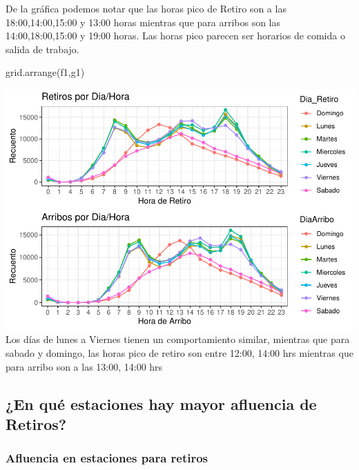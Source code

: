 \documentclass[
]{article}
\newenvironment{Shaded}{\begin{snugshade}}{\end{snugshade}}
\newcommand{\FunctionTok}[1]{\textcolor[rgb]{0.00,0.00,0.00}{#1}}
\newcommand{\NormalTok}[1]{#1}
\begin{document}
De la gráfica podemos notar que las horas pico de Retiro son a las
18:00,14:00,15:00 y 13:00 horas mientras que para arribos son las
14:00,18:00,15:00 y 19:00 horas. Las horas pico parecen ser horarios de
comida o salida de trabajo.

\begin{Shaded}
\begin{Highlighting}[]
\FunctionTok{grid.arrange}\NormalTok{(f1,g1)}
\end{Highlighting}
\end{Shaded}

\includegraphics{Ecobici_files/figure-latex/unnamed-chunk-3-1.pdf} Los
días de lunes a Viernes tienen un comportamiento similar, mientras que
para sabado y domingo, las horas pico de retiro son entre 12:00, 14:00
hrs mientras que para arribo son a las 13:00, 14:00 hrs

\hypertarget{en-quuxe9-estaciones-hay-mayor-afluencia-de-retiros}{%
\subsection{¿En qué estaciones hay mayor afluencia de
Retiros?}\label{en-quuxe9-estaciones-hay-mayor-afluencia-de-retiros}}

\hypertarget{afluencia-en-estaciones-para-retiros}{%
\subsubsection{Afluencia en estaciones para
retiros}\label{afluencia-en-estaciones-para-retiros}}
\end{document}
